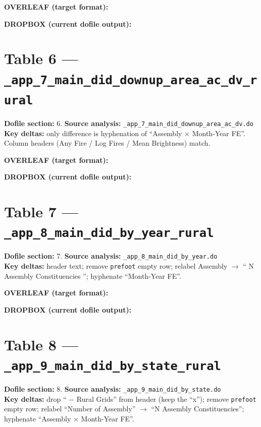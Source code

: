 \documentclass[10pt,landscape]{article}
\newcommand{\OV}[1]{%
  \begin{center}
    \colorbox{green!10}{\parbox{0.97\linewidth}{%
      \textbf{\textcolor{green!50!black}{OVERLEAF (target format):}}\par\vspace{0.3em}
      \centering #1
    }}
  \end{center}
}
\newcommand{\DB}[1]{%
  \begin{center}
    \colorbox{red!10}{\parbox{0.97\linewidth}{%
      \textbf{\textcolor{red!60!black}{DROPBOX (current dofile output):}}\par\vspace{0.3em}
      \centering #1
    }}
  \end{center}
}
\newcommand{\OVPATH}{/Users/anzony.quisperojas/Library/CloudStorage/Dropbox/Aplicaciones/Overleaf/sa_fires_politicians/tables}
\newcommand{\DBPATH}{/Users/anzony.quisperojas/Library/CloudStorage/Dropbox/sa_fires/proj_bureaucrats_farms/tex/paper/tables}
\begin{document}
\OV{}
\DB{}

\newpage

\section{Table 6 --- \texttt{\_app\_7\_main\_did\_downup\_area\_ac\_dv\_rural}}
\noindent\textbf{Dofile section:} 6.\quad
\textbf{Source analysis:} \texttt{\_app\_7\_main\_did\_downup\_area\_ac\_dv.do}\\
\textbf{Key deltas:} only difference is hyphenation of ``Assembly $\times$ Month-Year FE''.
Column headers (Any Fire / Log Fires / Mean Brightness) match.

\OV{}
\DB{}

\newpage

\section{Table 7 --- \texttt{\_app\_8\_main\_did\_by\_year\_rural}}
\noindent\textbf{Dofile section:} 7.\quad
\textbf{Source analysis:} \texttt{\_app\_8\_main\_did\_by\_year.do}\\
\textbf{Key deltas:} header text; remove \texttt{prefoot} empty row;
relabel Assembly $\rightarrow$ `` N Assembly Constituencies ''; hyphenate ``Month-Year FE''.

\OV{\resizebox{0.95\linewidth}{!}{}}
\DB{\resizebox{0.95\linewidth}{!}{}}

\newpage

\section{Table 8 --- \texttt{\_app\_9\_main\_did\_by\_state\_rural}}
\noindent\textbf{Dofile section:} 8.\quad
\textbf{Source analysis:} \texttt{\_app\_9\_main\_did\_by\_state.do}\\
\textbf{Key deltas:} drop `` $-$ Rural Grids'' from header (keep the ``x''); remove
\texttt{prefoot} empty row; relabel ``Number of Assembly'' $\rightarrow$
``N Assembly Constituencies''; hyphenate ``Assembly $\times$ Month-Year FE''.
\end{document}
